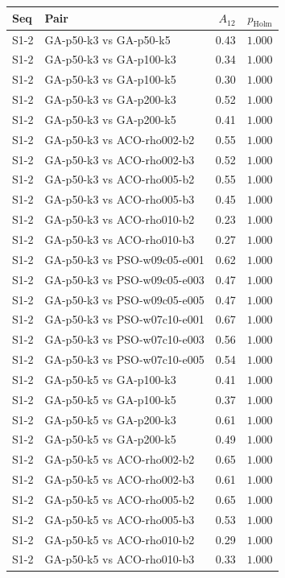 \begin{tabular}{llrr}
\toprule
Seq & Pair & $A_{12}$ & $p_{\mathrm{Holm}}$ \\
\midrule
S1-2 & GA-p50-k3 vs GA-p50-k5 & 0.43 & $1.000$ \\
S1-2 & GA-p50-k3 vs GA-p100-k3 & 0.34 & $1.000$ \\
S1-2 & GA-p50-k3 vs GA-p100-k5 & 0.30 & $1.000$ \\
S1-2 & GA-p50-k3 vs GA-p200-k3 & 0.52 & $1.000$ \\
S1-2 & GA-p50-k3 vs GA-p200-k5 & 0.41 & $1.000$ \\
S1-2 & GA-p50-k3 vs ACO-rho002-b2 & 0.55 & $1.000$ \\
S1-2 & GA-p50-k3 vs ACO-rho002-b3 & 0.52 & $1.000$ \\
S1-2 & GA-p50-k3 vs ACO-rho005-b2 & 0.55 & $1.000$ \\
S1-2 & GA-p50-k3 vs ACO-rho005-b3 & 0.45 & $1.000$ \\
S1-2 & GA-p50-k3 vs ACO-rho010-b2 & 0.23 & $1.000$ \\
S1-2 & GA-p50-k3 vs ACO-rho010-b3 & 0.27 & $1.000$ \\
S1-2 & GA-p50-k3 vs PSO-w09c05-e001 & 0.62 & $1.000$ \\
S1-2 & GA-p50-k3 vs PSO-w09c05-e003 & 0.47 & $1.000$ \\
S1-2 & GA-p50-k3 vs PSO-w09c05-e005 & 0.47 & $1.000$ \\
S1-2 & GA-p50-k3 vs PSO-w07c10-e001 & 0.67 & $1.000$ \\
S1-2 & GA-p50-k3 vs PSO-w07c10-e003 & 0.56 & $1.000$ \\
S1-2 & GA-p50-k3 vs PSO-w07c10-e005 & 0.54 & $1.000$ \\
S1-2 & GA-p50-k5 vs GA-p100-k3 & 0.41 & $1.000$ \\
S1-2 & GA-p50-k5 vs GA-p100-k5 & 0.37 & $1.000$ \\
S1-2 & GA-p50-k5 vs GA-p200-k3 & 0.61 & $1.000$ \\
S1-2 & GA-p50-k5 vs GA-p200-k5 & 0.49 & $1.000$ \\
S1-2 & GA-p50-k5 vs ACO-rho002-b2 & 0.65 & $1.000$ \\
S1-2 & GA-p50-k5 vs ACO-rho002-b3 & 0.61 & $1.000$ \\
S1-2 & GA-p50-k5 vs ACO-rho005-b2 & 0.65 & $1.000$ \\
S1-2 & GA-p50-k5 vs ACO-rho005-b3 & 0.53 & $1.000$ \\
S1-2 & GA-p50-k5 vs ACO-rho010-b2 & 0.29 & $1.000$ \\
S1-2 & GA-p50-k5 vs ACO-rho010-b3 & 0.33 & $1.000$ \\

\end{tabular}
